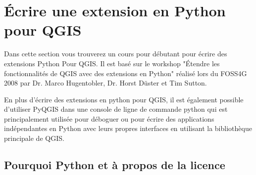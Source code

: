 
\section{Écrire une extension en Python pour QGIS}



Dans cette section vous trouverez un cours pour débutant pour écrire des
extensions Python Pour QGIS. Il est basé sur le workshop "Étendre les
fonctionnalités de QGIS avec des extensions en Python" réalisé lors du FOSS4G 2008
par  Dr. Marco Hugentobler, Dr. Horst D\"uster et Tim Sutton.


En plus d'écrire des extensions en python pour QGIS, il est également possible
d'utiliser PyQGIS dans une console de ligne de commande python qui est
principalement utilisée pour déboguer ou pour écrire des applications
indépendantes en Python avec leurs propres interfaces en utilisant la
bibliothèque principale de QGIS.

\subsection{Pourquoi Python et à propos de la licence}


